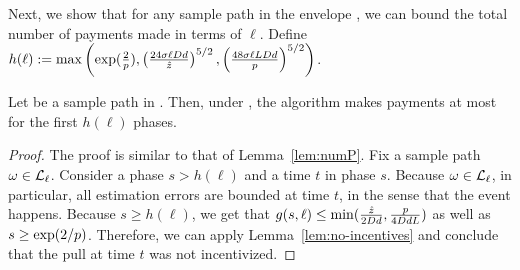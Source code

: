 Next, we show that for any sample path \SP in the envelope \Env{\ell},
we can bound the total number of payments made in terms of $\ell$.
Define $h(\ell) := \max \left( \exp(\frac{2}{p}),
\left( \frac{24 \sigma \ell D d}{\hat{z}} \right)^{5/2},
\left( \frac{48 \sigma \ell L D d}{p} \right)^{5/2}
\right)$.

\begin{lemma} \label{lem:envelope-payments}
Let \SP be a sample path in \Env{\ell}.
Then, under \SP, the algorithm makes payments at most for the first 
$h(\ell)$ phases. 
\end{lemma}

\begin{proof}
The proof is similar to that of Lemma~\ref{lem:numP}.
Fix a sample path $\omega \in {\mathcal L}_{\ell}$.
Consider a phase $s > h(\ell)$ and a time $t$ in phase $s$.
Because $\omega \in {\mathcal L}_{\ell}$, in particular, all estimation errors are
bounded at time $t$, in the sense that the event 
happens.
Because $s \geq h(\ell)$, we get that
$g(s,\ell) \leq \min(\frac{\hat{z}}{2D d}, \frac{p}{4 D d L})$
as well as $s \geq \exp(2/p)$.
Therefore, we can apply Lemma~\ref{lem:no-incentives} and conclude
that the pull at time $t$ was not incentivized.
\end{proof}

